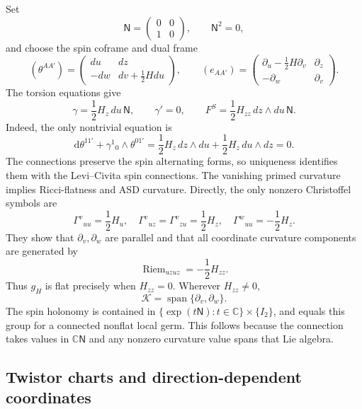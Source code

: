 \documentclass[11pt]{article}
\numberwithin{equation}{section}
\theoremstyle{definition}
\theoremstyle{remark}
\newcommand{\C}{\mathbb C}
\newcommand{\dd}{\mathrm d}
\newcommand{\Riem}{\operatorname{Riem}}
\newcommand{\Span}{\operatorname{span}}
\newcommand{\NN}{\mathsf N}
\newcommand{\II}{I_2}
\newcommand{\calK}{\mathcal K}
\begin{document}
Set
\begin{equation}\label{eq:nilpotent}
\NN=\begin{pmatrix}0&0\\1&0\end{pmatrix},\qquad \NN^2=0,
\end{equation}
and choose the spin coframe and dual frame
\begin{equation}\label{eq:wave-frame}
(\theta^{AA'})=
\begin{pmatrix}du&dz\\-dw&dv+\frac12Hdu\end{pmatrix},
\qquad
(e_{AA'})=
\begin{pmatrix}\partial_u-\frac12H\partial_v&\partial_z\\-\partial_w&\partial_v\end{pmatrix}.
\end{equation}
The torsion equations give
\begin{equation}\label{eq:wave-spin}
\gamma=\frac12H_z\,du\,\NN,
\qquad \gamma'=0,
\qquad F^S=\frac12H_{zz}\,dz\wedge du\,\NN.
\end{equation}
Indeed, the only nontrivial equation is
\[
\dd\theta^{11'}+\gamma^1{}_0\wedge\theta^{01'}
=\frac12H_z\,dz\wedge du+\frac12H_z\,du\wedge dz=0.
\]
The connections preserve the spin alternating forms, so uniqueness identifies them with the Levi--Civita spin connections. The vanishing primed curvature implies Ricci-flatness and ASD curvature. Directly, the only nonzero Christoffel symbols are
\[
\Gamma^v{}_{uu}=\frac12H_u,
\quad \Gamma^v{}_{uz}=\Gamma^v{}_{zu}=\frac12H_z,
\quad \Gamma^w{}_{uu}=-\frac12H_z.
\]
They show that $\partial_v,\partial_w$ are parallel and that all coordinate curvature components are generated by
\begin{equation}\label{eq:wave-riem}
\Riem_{uzuz}=-\frac12H_{zz}.
\end{equation}
Thus $g_H$ is flat precisely when $H_{zz}=0$. Wherever $H_{zz}\ne0$,
\begin{equation}\label{eq:wave-nullity}
\calK=\Span\{\partial_v,\partial_w\}.
\end{equation}
The spin holonomy is contained in $\{\exp(t\NN):t\in\C\}\times\{\II\}$, and equals this group for a connected nonflat local germ. This follows because the connection takes values in $\C\NN$ and any nonzero curvature value spans that Lie algebra.

\subsection{Twistor charts and direction-dependent coordinates}
\end{document}
